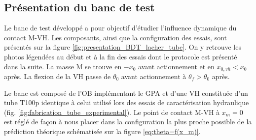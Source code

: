 	\subsection{Présentation du banc de test}
	\label{subsec:4.3.1_Presentation du banc de test}
Le banc de test développé a pour objectif d'étudier l'influence dynamique du contact M-VH. Les composants, ainsi que la configuration des essais, sont présentés sur la figure \ref{fig:presentation_BDT_lacher_tube}. On y retrouve les photos légendées au début et à la fin des essais dont le protocole est présenté dans la suite. La masse M se trouve en $-x_0$ avant actionnement et en $x_{0,vh}<x_0$ après. La flexion de la VH passe de $\theta_0$ avant actionnement à $\theta_f>\theta_0$ après.

Le banc est composé de l'OB implémentant le GPA et d'une VH constituée d'un tube T100p identique à celui utilisé lors des essais de caractérisation hydraulique (fig. \ref{fig:fabrication_tube_experimental}). Le point de contact M-VH à $x_m=0$ est réglé de façon à nous placer dans la configuration la plus proche possible de la prédiction théorique schématisée sur la figure \ref{eq:theta=f(x_m)}.
